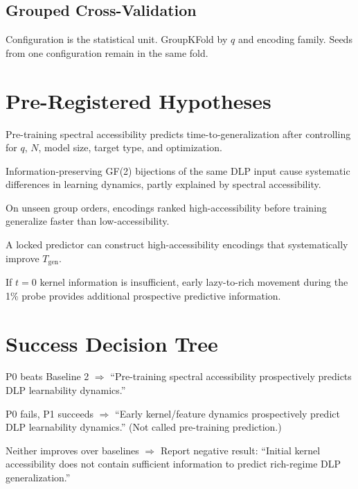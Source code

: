 \documentclass[11pt]{article}
\begin{document}
\subsection{Grouped Cross-Validation}

Configuration is the statistical unit. GroupKFold by $q$ and encoding family. Seeds from one configuration remain in the same fold.

\section{Pre-Registered Hypotheses}\label{sec:hypotheses}

\begin{description}[leftmargin=*]
    \item[H1:] Pre-training spectral accessibility predicts time-to-generalization after controlling for $q$, $N$, model size, target type, and optimization.
    \item[H2:] Information-preserving GF(2) bijections of the same DLP input cause systematic differences in learning dynamics, partly explained by spectral accessibility.
    \item[H3:] On unseen group orders, encodings ranked high-accessibility before training generalize faster than low-accessibility.
    \item[H4:] A locked predictor can construct high-accessibility encodings that systematically improve $T_{\text{gen}}$.
    \item[H5:] If $t=0$ kernel information is insufficient, early lazy-to-rich movement during the 1\% probe provides additional prospective predictive information.
\end{description}

\section{Success Decision Tree}\label{sec:decision}

\begin{description}[leftmargin=*]
    \item[Case A:] P0 beats Baseline 2 $\Rightarrow$ ``Pre-training spectral accessibility prospectively predicts DLP learnability dynamics.''
    \item[Case B:] P0 fails, P1 succeeds $\Rightarrow$ ``Early kernel/feature dynamics prospectively predict DLP learnability dynamics.'' (Not called pre-training prediction.)
    \item[Case C:] Neither improves over baselines $\Rightarrow$ Report negative result: ``Initial kernel accessibility does not contain sufficient information to predict rich-regime DLP generalization.''
\end{description}
\end{document}
